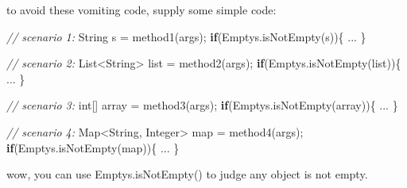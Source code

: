 \documentclass[
]{book}
\newenvironment{Shaded}{\begin{snugshade}}{\end{snugshade}}
\newcommand{\BuiltInTok}[1]{#1}
\newcommand{\CommentTok}[1]{\textcolor[rgb]{0.56,0.35,0.01}{\textit{#1}}}
\newcommand{\DataTypeTok}[1]{\textcolor[rgb]{0.13,0.29,0.53}{#1}}
\newcommand{\FunctionTok}[1]{\textcolor[rgb]{0.00,0.00,0.00}{#1}}
\newcommand{\KeywordTok}[1]{\textcolor[rgb]{0.13,0.29,0.53}{\textbf{#1}}}
\newcommand{\NormalTok}[1]{#1}
\begin{document}
to avoid these vomiting code, supply some simple code:

\begin{Shaded}
\begin{Highlighting}[]
\CommentTok{// scenario 1:}
\BuiltInTok{String}\NormalTok{ s = }\FunctionTok{method1}\NormalTok{(args);}
\KeywordTok{if}\NormalTok{(Emptys.}\FunctionTok{isNotEmpty}\NormalTok{(s))\{}
\NormalTok{    ...}
\NormalTok{\}}

\CommentTok{// scenario 2:}
\BuiltInTok{List}\NormalTok{<}\BuiltInTok{String}\NormalTok{> list = }\FunctionTok{method2}\NormalTok{(args);}
\KeywordTok{if}\NormalTok{(Emptys.}\FunctionTok{isNotEmpty}\NormalTok{(list))\{}
\NormalTok{    ...}
\NormalTok{\}}


\CommentTok{// scenario 3:}
\DataTypeTok{int}\NormalTok{[] array = }\FunctionTok{method3}\NormalTok{(args);}
\KeywordTok{if}\NormalTok{(Emptys.}\FunctionTok{isNotEmpty}\NormalTok{(array))\{}
\NormalTok{    ...}
\NormalTok{\}}

\CommentTok{// scenario 4:}
\BuiltInTok{Map}\NormalTok{<}\BuiltInTok{String}\NormalTok{, }\BuiltInTok{Integer}\NormalTok{> map = }\FunctionTok{method4}\NormalTok{(args);}
\KeywordTok{if}\NormalTok{(Emptys.}\FunctionTok{isNotEmpty}\NormalTok{(map))\{}
\NormalTok{    ...}
\NormalTok{\}}
\end{Highlighting}
\end{Shaded}

wow, you can use Emptys.isNotEmpty() to judge any object is not empty.
\end{document}
